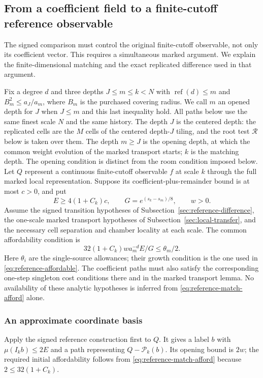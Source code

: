 \subsection{From a coefficient field to a finite-cutoff reference observable}
\label{sec:reference-match}
The signed comparison must control the original finite-cutoff
observable, not only its coefficient vector. This requires a
simultaneous marked argument. We explain the finite-dimensional
matching and the exact replicated difference used in that argument.

Fix a degree $d$ and three depths $J\le m\le k<N$ with
$\operatorname{ref}(d)\le m$ and $B_m^2\le a_J/a_m$, where $B_m$
is the purchased covering radius. We call $m$ an opened depth for $J$
when $J\le m$ and this last inequality hold. All paths below use the same finest scale
$N$ and the same history. The depth $J$ is the centered depth: the
replicated cells are the $M$ cells of the centered depth-$J$ tiling,
and the root test $\mathcal R$ below is taken over them. The depth
$m\ge J$ is the opening depth, at which the common weight evolution of
the marked transport starts; $k$ is the matching depth. The opening
condition is distinct from the room condition imposed below. Let $Q$ represent a continuous finite-cutoff observable
$f$ at scale $k$ through the full marked local representation.
Suppose its coefficient-plus-remainder bound is at most $c>0$,
and put
\[
 E\ge4(1+C_k)c,\qquad
 G=e^{(s_k-s_m)/8},\qquad w>0.
\]
Assume the signed transition hypotheses of
Subsection~\ref{sec:reference-difference}, the one-scale marked
transport hypotheses of Subsection~\ref{sec:local-transfer}, and
the necessary cell separation and chamber locality at each scale.
The common affordability condition is
\begin{equation}\label{eq:reference-match-afford}
       32(1+C_k)w a_m^{-d}E/G\le\theta_m/2.
\end{equation}
Here $\theta_i$ are the single-source allowances; their growth
condition is the one used in \eqref{eq:reference-affordable}.
The coefficient paths must also satisfy the corresponding
one-step singleton cost conditions there and in the marked
transport lemma. No availability of these analytic hypotheses
is inferred from \eqref{eq:reference-match-afford} alone.

\subsubsection{An approximate coordinate basis}
Apply the signed reference construction first to $Q$. It gives a
label $b$ with $\mu(I_kb)\le2E$ and a path representing
$Q-\mathcal P_k(b)$. Its opening bound is $2w$; the required
initial affordability follows from
\eqref{eq:reference-match-afford} because
$2\le32(1+C_k)$.

